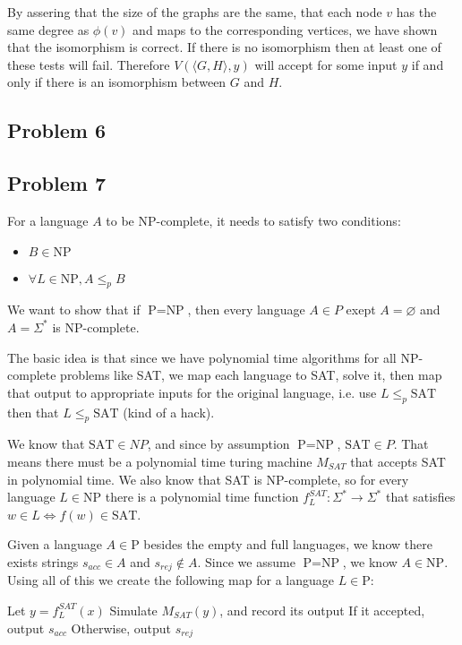 \documentclass[english]{article}
\begin{document}
By assering that the size of the graphs are the same, that each node $v$ has
the same degree as $\phi(v)$ and maps to the corresponding vertices, we have
shown that the isomorphism is correct. If there is no isomorphism then at
least one of these tests will fail. Therefore $V(\langle G, H \rangle,y)$
will accept for some input $y$ if and only if there is an isomorphism between
$G$ and $H$.

\subsection*{Problem 6}

\subsection*{Problem 7}
For a language $A$ to be NP-complete, it needs to satisfy two conditions:
\begin{itemize}
\item $B \in \textrm{NP}$
\item $\forall L \in \textrm{NP}, A \le_p B$
\end{itemize}
We want to show that if $\textrm{P} = \textrm{NP}$, then every language
$A \in P$ exept $A = \varnothing$ and $A = \Sigma^*$ is NP-complete. 

The basic idea is that since we have polynomial time algorithms for all
NP-complete problems like SAT, we map each language to SAT, solve it, then map
that output to appropriate inputs for the original language, i.e. use
$L \le_p \textrm{SAT}$ then that $L \le_p \textrm{SAT}$ (kind of a hack). 

We know that $\textrm{SAT} \in NP$, and since by assumption
$\textrm{P} = \textrm{NP}$, $\textrm{SAT} \in P$. That means there must be a
polynomial time turing machine $M_{SAT}$ that accepts SAT in polynomial time.
We also know that SAT is NP-complete, so for every language $L \in \textrm{NP}$
there is a polynomial time function $f^{SAT}_L : \Sigma^* \rightarrow \Sigma^*$
that satisfies $w \in L \iff f(w) \in \textrm{SAT}$.

Given a language $A \in \textrm{P}$ besides the empty and full languages, we 
know there exists strings $s_{acc} \in A$ and $s_{rej} \notin A$. Since
we assume $\textrm{P} = \textrm{NP}$, we know $A \in \textrm{NP}$. Using all of
this we create the following map for a language $L \in \textrm{P}$:
\begin{algorithmic}
\State Let $y = f^{SAT}_L(x)$
\State Simulate $M_{SAT}(y)$, and record its output
\State If it accepted, output $s_{acc}$
\State Otherwise, output $s_{rej}$
\EndFunction 
\end{algorithmic}
\end{document}
